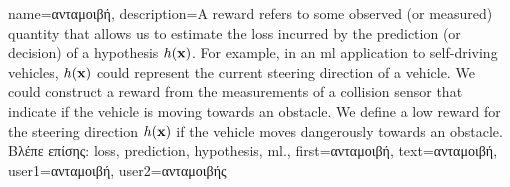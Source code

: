 {name={\foreignlanguage{greek}{ανταμοιβή}}, 
	description={A reward refers to some observed 
		(or measured) quantity that allows us to estimate the \gls{loss} incurred by the \gls{prediction} 
		(or decision) of a \gls{hypothesis} $h({\bf x})$. For example, in an 
		\gls{ml} application to self-driving vehicles, $h({\bf x})$ could represent 
		the current steering direction of a vehicle. We could construct a reward from the 
		measurements of a collision sensor that indicate if the vehicle is moving towards 
		an obstacle. We define a low reward for the steering direction 
	$h({\bf x})$ if the vehicle moves dangerously towards an obstacle.\\
	\foreignlanguage{greek}{Βλέπε επίσης:} \gls{loss}, \gls{prediction}, \gls{hypothesis}, \gls{ml}.},
	first={\foreignlanguage{greek}{ανταμοιβή}}, 
	text={\foreignlanguage{greek}{ανταμοιβή}},
	user1={\foreignlanguage{greek}{ανταμοιβή}}, %
	user2={\foreignlanguage{greek}{ανταμοιβής}} %
} 

